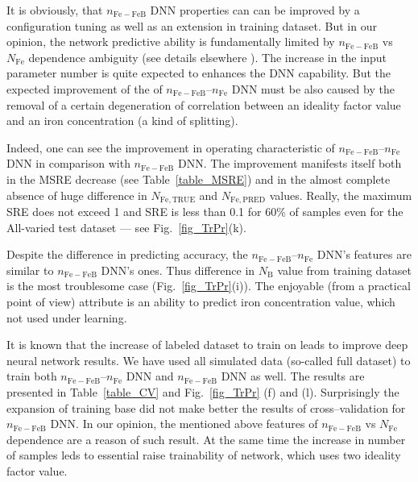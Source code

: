 \documentclass[journal]{IEEEtran}
\begin{document}
It is obviously, that $n_\mathrm{Fe-FeB}$ DNN  properties can can be improved by a configuration tuning as well as an extension in training dataset.
But in our opinion, the network predictive ability is fundamentally limited by $n_\mathrm{Fe-FeB}$ vs $N_\mathrm{Fe}$ dependence ambiguity (see details elsewhere \cite{OlikhJPS}).
The increase in the input parameter number is quite expected to enhances the DNN capability.
But the expected improvement of the of $n_\mathrm{Fe-FeB}$--$n_\mathrm{Fe}$ DNN must be also caused by the removal of a certain degeneration of correlation between an ideality factor value and an iron concentration (a kind of splitting).

Indeed, one can see the improvement in operating characteristic 
of $n_\mathrm{Fe-FeB}$--$n_\mathrm{Fe}$ DNN in comparison with $n_\mathrm{Fe-FeB}$ DNN.
The improvement manifests itself both in the MSRE decrease (see Table~\ref{table_MSRE}) and 
in the almost complete absence of huge 
difference in $N_\mathrm{Fe,TRUE}$ and $N_\mathrm{Fe,PRED}$ values.
Really, the maximum SRE does not exceed 1 and SRE is less than 0.1 for 60\% of samples 
even for the All-varied test dataset --- see Fig.~\ref{fig_TrPr}(k).

Despite the difference in predicting accuracy, 
the $n_\mathrm{Fe-FeB}$--$n_\mathrm{Fe}$ DNN's features are similar to  $n_\mathrm{Fe-FeB}$ DNN's ones.
Thus difference in $N_\mathrm{B}$ value from training dataset is the most troublesome case 
(Fig.~\ref{fig_TrPr}(i)).
The enjoyable (from a practical point of view) attribute is an ability to predict iron concentration value, which not used under learning. 

It is known \cite{Keras} that the increase of labeled dataset to train on leads to improve  deep neural network results.
We have used all simulated data (so-called full dataset) to train both 
$n_\mathrm{Fe-FeB}$--$n_\mathrm{Fe}$ DNN and $n_\mathrm{Fe-FeB}$ DNN as well.
The results are presented in Table~\ref{table_CV} and Fig.~\ref{fig_TrPr} (f) and (l).
Surprisingly the expansion of training base did not make better the results of cross--validation 
for $n_\mathrm{Fe-FeB}$ DNN.
In our opinion, the mentioned above features of $n_\mathrm{Fe-FeB}$ vs $N_\mathrm{Fe}$ dependence
are a reason of such result.
At the same time the increase in number of samples leds to essential raise trainability of network, which uses two ideality factor value.


\end{document}
